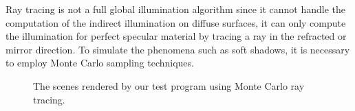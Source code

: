 Ray tracing is not a full global illumination algorithm since it cannot handle the computation of the indirect illumination on diffuse surfaces, it can only compute the illumination for perfect specular material by tracing a ray in the refracted or mirror direction. To simulate the phenomena such as soft shadows, it is necessary to employ Monte Carlo sampling techniques\cite{Kajiya:1986:RE:15922.15902}. 

\begin{figure}[htp] 
\begin{center}
    \renewcommand{\thefigure}{\thechapter.\arabic{figure}}
    \caption[Test Scenes Rendered Using Monte-Carlo Ray Tracing]{The scenes rendered by our test program using Monte Carlo ray tracing. }
    \label{fig:rt_images} 
\end{center} 
\end{figure}

